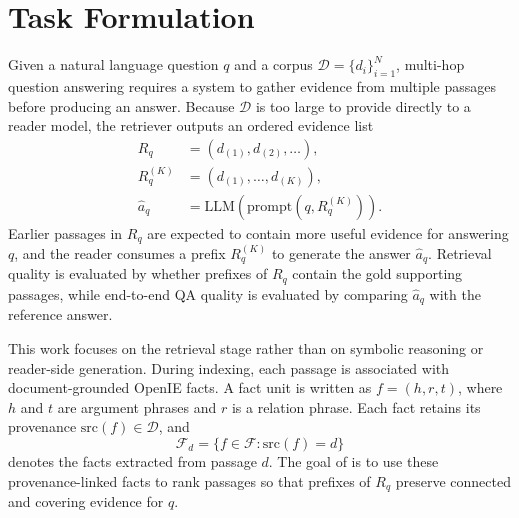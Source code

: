 %
%

\section{Task Formulation}
\label{sec:task}

Given a natural language question $q$ and a corpus
$\mathcal{D}=\{d_i\}_{i=1}^{N}$, multi-hop question answering requires a
system to gather evidence from multiple passages before producing an
answer. Because $\mathcal{D}$ is too large to provide directly to a
reader model, the retriever outputs an ordered evidence list
\[
\begin{aligned}
R_q &= (d_{(1)},d_{(2)},\ldots), \\
R_q^{(K)} &= (d_{(1)},\ldots,d_{(K)}), \\
\hat{a}_q &= \mathrm{LLM}(\mathrm{prompt}(q,R_q^{(K)})).
\end{aligned}
\]
Earlier passages in $R_q$ are expected to contain more useful evidence
for answering $q$, and the reader consumes a prefix $R_q^{(K)}$ to
generate the answer $\hat{a}_q$. Retrieval quality is evaluated by
whether prefixes of $R_q$ contain the gold supporting passages, while
end-to-end QA quality is evaluated by comparing $\hat{a}_q$ with the
reference answer.

This work focuses on the retrieval stage rather than on symbolic
reasoning or reader-side generation. During indexing, each passage is
associated with document-grounded OpenIE facts. A fact unit is written as
$f=(h,r,t)$, where $h$ and $t$ are argument phrases and $r$ is a relation
phrase. Each fact retains its provenance
$\mathrm{src}(f)\in\mathcal{D}$, and
\[
\mathcal{F}_d=\{f\in\mathcal{F}: \mathrm{src}(f)=d\}
\]
denotes the facts extracted from passage $d$. The goal of
\methodname{} is to use these provenance-linked facts to rank passages
so that prefixes of $R_q$ preserve connected and covering evidence for
$q$.
